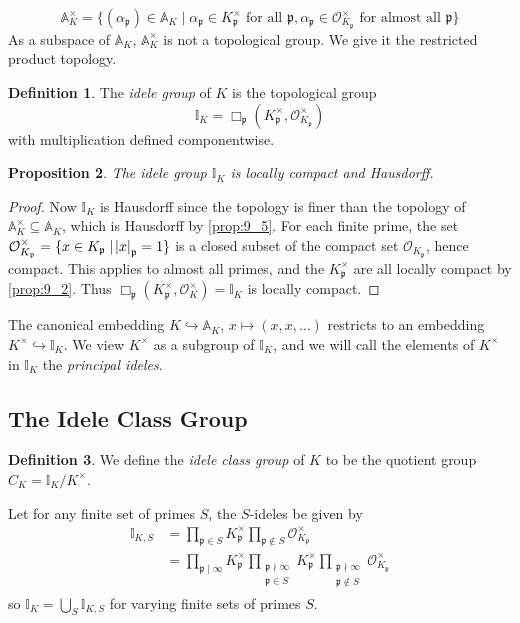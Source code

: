 \documentclass[11pt]{article}
\theoremstyle{definition}
\newtheorem{definition}{Definition}[section]
\theoremstyle{plain}
\newtheorem{proposition}[definition]{Proposition}
\theoremstyle{remark}
\newcommand{\bA}{\mathbb{A}}
\newcommand{\II}{\mathbb{I}}
\newcommand{\cO}{\mathcal{O}}
\newcommand{\fp}{\mathfrak{p}}
\newcommand{\rprod}{\Box} %
\begin{document}
\begin{equation*}
    \bA_K^\times = \{(\alpha_\fp) \in \bA_K \mid \alpha_\fp \in K_\fp^\times \text{ for all } \fp, \alpha_\fp \in \cO_{K_\fp}^\times \text{ for almost all } \fp\}
\end{equation*}
As a subspace of $\bA_K$, $\bA_K^\times$ is not a topological group. We give it the restricted product topology.

\begin{definition}\label{def:9_6}
    The \emph{idele group} of $K$ is the topological group
    \begin{equation*}
        \II_K = \rprod_{\fp} (K_\fp^\times, \cO_{K_\fp}^\times)
    \end{equation*}
    with multiplication defined componentwise.
\end{definition}

\begin{proposition}\label{prop:9_7}
    The idele group $\II_K$ is locally compact and Hausdorff.
\end{proposition}
\begin{proof}
    Now $\II_K$ is Hausdorff since the topology is finer than the topology of $\bA_K^\times \subseteq \bA_K$, which is Hausdorff by \autoref{prop:9_5}. For each finite prime, the set $\cO_{K_\fp}^\times = \{x \in K_\fp \mid \abs{x}_\fp = 1\}$ is a closed subset of the compact set $\cO_{K_\fp}$, hence compact. This applies to almost all primes, and the $K_\fp^\times$ are all locally compact by \autoref{prop:9_2}. Thus $\rprod_\fp (K_\fp^\times, \cO_K^\times) = \II_K$ is locally compact.
\end{proof}

The canonical embedding $K \hookrightarrow \bA_K$, $x \mapsto (x, x, \ldots)$ restricts to an embedding $K^\times \hookrightarrow \II_K$. We view $K^\times$ as a subgroup of $\II_K$, and we will call the elements of $K^\times$ in $\II_K$ the \emph{principal ideles}.

\subsection{The Idele Class Group}

\begin{definition}\label{def:9_8}
    We define the \emph{idele class group} of $K$ to be the quotient group $C_K = \II_K / K^\times$.
\end{definition}

Let for any finite set of primes $S$, the $S$-ideles be given by
\begin{align*}
    \II_{K,S}
    &= \prod_{\fp \in S} K_{\fp}^\times \prod_{\fp \notin S} \cO_{K_\fp}^\times\\
    &= \prod_{\fp \mid \infty} K_{\fp}^\times \prod_{\substack{\fp \nmid \infty \\ \fp \in S}} K_{\fp}^\times \prod_{\substack{\fp \nmid \infty \\ \fp \notin S}} \cO_{K_\fp}^\times
\end{align*}
so $\II_K = \bigcup_{S} \II_{K,S}$ for varying finite sets of primes $S$.
\end{document}
